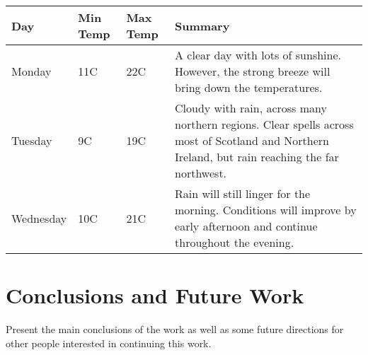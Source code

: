 \documentclass[10pt,twocolumn,letterpaper]{article}
\begin{document}
\begin{table*}
\begin{center}
    \begin{tabular}{ | l | l | l | p{8cm} |}
    \hline
    Day & Min Temp & Max Temp & Summary \\ \hline
    Monday & 11C & 22C & A clear day with lots of sunshine.  
    However, the strong breeze will bring down the temperatures. \\ \hline
    Tuesday & 9C & 19C & Cloudy with rain, across many northern regions. Clear spells
    across most of Scotland and Northern Ireland,
    but rain reaching the far northwest. \\ \hline
    Wednesday & 10C & 21C & Rain will still linger for the morning.
    Conditions will improve by early afternoon and continue
    throughout the evening. \\
    \hline
    \end{tabular}
\end{center}    
\end{table*}

\section{Conclusions and Future Work}
Present the main conclusions of the work as well as some future directions for other people interested in continuing this work. 

{\small


}
\end{document}
